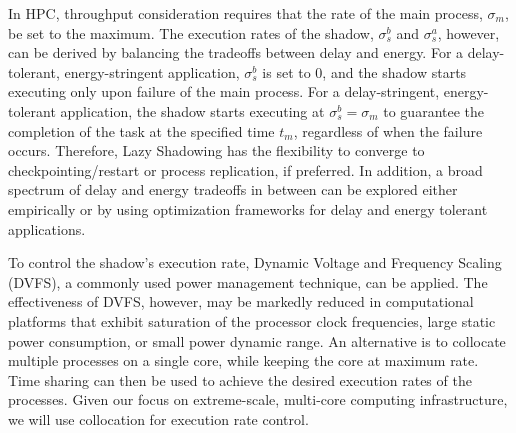 
In HPC, throughput consideration requires that the rate of the main process, $\sigma_m$, be set to the maximum. 
The execution rates of the shadow, $\sigma_s^b$ and $\sigma_s^a$, however, can be derived by balancing the tradeoffs between delay and energy.
For a delay-tolerant, energy-stringent application, $\sigma_s^b$ is set to 0, and the shadow starts executing only upon failure of the main process. %
For a delay-stringent, energy-tolerant application, the shadow starts executing at $\sigma_s^b=\sigma_m$ to guarantee the completion of the task at the specified time $t_m$, regardless of when the failure occurs. Therefore, Lazy Shadowing has the flexibility to converge to checkpointing/restart or process replication, if preferred. In addition,  
a broad spectrum of delay and energy tradeoffs in between can be explored either empirically or by using optimization frameworks for delay and energy tolerant applications.






To control the shadow's execution rate, Dynamic Voltage and Frequency Scaling (DVFS), a commonly used power management technique, can be applied. 
The effectiveness of DVFS, however, may be markedly reduced in computational platforms that exhibit saturation of the processor clock frequencies, large static power consumption, or small power dynamic range. An alternative is to collocate multiple processes on a single core, while keeping the core at maximum rate. Time sharing can then be used to achieve the desired execution rates of the processes. Given our focus on extreme-scale, multi-core computing infrastructure, we will use collocation for execution rate control.  

